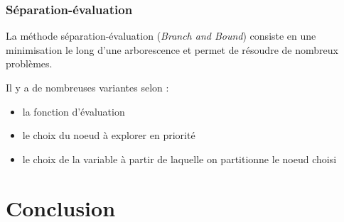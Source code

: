\documentclass{beamer}
\begin{document}
\begin{frame}
  \frametitle{Séparation-évaluation}

  La méthode séparation-évaluation (\emph{Branch and Bound})
  consiste en une minimisation le long d'une arborescence
  et permet de résoudre de nombreux problèmes.

  Il y a de nombreuses variantes selon :
  \begin{itemize}
  \item la fonction d'évaluation
  \item le choix du noeud à explorer en priorité
  \item le choix de la variable à partir de laquelle on partitionne le noeud choisi
  \end{itemize}
  
\end{frame}


\section{Conclusion}


  
\end{document}
